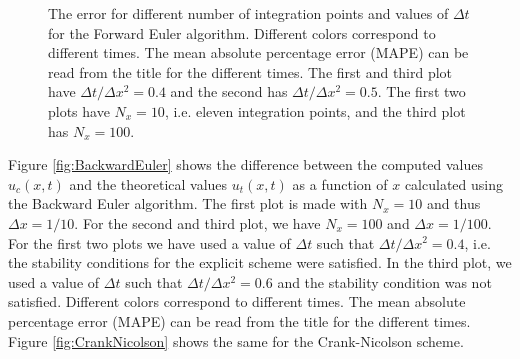 \documentclass[reprint, english,notitlepage,nofootinbib]{revtex4-1}  %
\begin{document}
\begin{figure}
  \caption{The error for different number of integration points and values of \(\Delta t\) for the Forward Euler algorithm. Different colors correspond to different times. The mean absolute percentage error (MAPE) can be read from the title for the different times. The first and third plot have \(\Delta t / \Delta x^2 = 0.4\) and the second has \(\Delta t / \Delta x^2 = 0.5\). The first two plots have \(N_x = 10\), i.e. eleven integration points, and the third plot has \(N_x = 100\).}
  \label{fig:ForwardEuler_error}
\end{figure}

Figure \ref{fig:BackwardEuler} shows the difference between the computed values \(u_c(x, t)\) and the theoretical values \(u_t(x, t)\) as a function of \(x\) calculated using the Backward Euler algorithm. The first plot is made with \(N_x = 10\) and thus \(\Delta x = 1/10\). For the second and third plot, we have \(N_x = 100\) and \(\Delta x = 1/100\). For the first two plots we have used a value of \(\Delta t\) such that \(\Delta t / \Delta x^2 = 0.4\), i.e. the stability conditions for the explicit scheme were satisfied. In the third plot, we used a value of \(\Delta t\) such that \(\Delta t / \Delta x^2 = 0.6\) and the stability condition was not satisfied. Different colors correspond to different times. The mean absolute percentage error (MAPE) can be read from the title for the different times.
Figure \ref{fig:CrankNicolson} shows the same for the Crank-Nicolson scheme.
\end{document}
